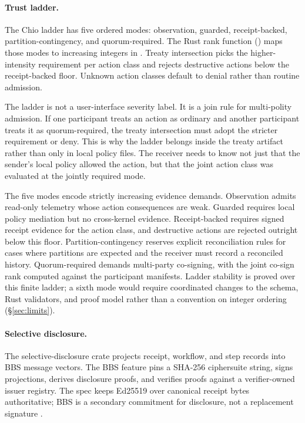\paragraph{Trust ladder.}
The Chio ladder has five ordered modes: observation, guarded, receipt-backed, partition-contingency, and quorum-required. The Rust rank function () maps those modes to increasing integers in . Treaty intersection picks the higher-intensity requirement per action class and rejects destructive actions below the receipt-backed floor. Unknown action classes default to denial rather than routine admission.

The ladder is not a user-interface severity label. It is a join rule for multi-polity admission. If one participant treats an action as ordinary and another participant treats it as quorum-required, the treaty intersection must adopt the stricter requirement or deny. This is why the ladder belongs inside the treaty artifact rather than only in local policy files. The receiver needs to know not just that the sender's local policy allowed the action, but that the joint action class was evaluated at the jointly required mode.

The five modes encode strictly increasing evidence demands. Observation admits read-only telemetry whose action consequences are weak. Guarded requires local policy mediation but no cross-kernel evidence. Receipt-backed requires signed receipt evidence for the action class, and destructive actions are rejected outright below this floor. Partition-contingency reserves explicit reconciliation rules for cases where partitions are expected and the receiver must record a reconciled history. Quorum-required demands multi-party co-signing, with the joint co-sign rank computed against the participant manifests. Ladder stability is proved over this finite ladder; a sixth mode would require coordinated changes to the schema, Rust validators, and proof model rather than a convention on integer ordering (\S\ref{sec:limits}).

\paragraph{Selective disclosure.}
The selective-disclosure crate projects receipt, workflow, and step records into BBS message vectors. The BBS feature pins a SHA-256 ciphersuite string, signs projections, derives disclosure proofs, and verifies proofs against a verifier-owned issuer registry. The spec keeps Ed25519 over canonical receipt bytes authoritative; BBS is a secondary commitment for disclosure, not a replacement signature \cite{boneh2004bbs,camenisch2001credentials,bbsDraft}.

